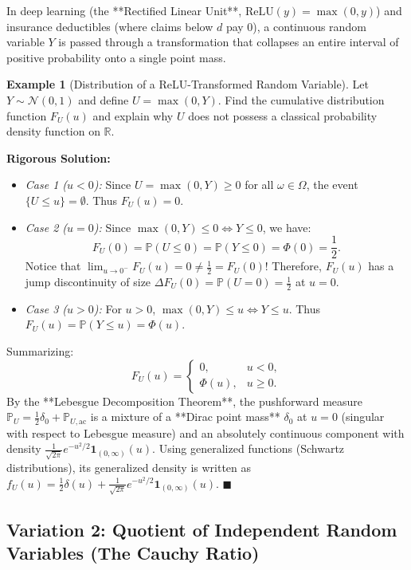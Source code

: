 \documentclass[11pt, letterpaper]{article}
\theoremstyle{definition}
\newtheorem{example}{Example}[section]
\theoremstyle{remark}
\newcommand{\R}{\mathbb{R}}
\newcommand{\Prob}{\mathbb{P}}
\begin{document}
In deep learning (the **Rectified Linear Unit**, $\text{ReLU}(y) = \max(0, y)$) and insurance deductibles (where claims below $d$ pay $0$), a continuous random variable $Y$ is passed through a transformation that collapses an entire interval of positive probability onto a single point mass.

\begin{example}[Distribution of a ReLU-Transformed Random Variable]
Let $Y \sim \mathcal{N}(0, 1)$ and define $U = \max(0, Y)$. Find the cumulative distribution function $F_U(u)$ and explain why $U$ does not possess a classical probability density function on $\R$.
\end{example}

\textbf{Rigorous Solution:}
\begin{itemize}
    \item \textit{Case 1 ($u < 0$):} Since $U = \max(0, Y) \ge 0$ for all $\omega \in \Omega$, the event $\{U \le u\} = \emptyset$. Thus $F_U(u) = 0$.
    \item \textit{Case 2 ($u = 0$):} Since $\max(0, Y) \le 0 \iff Y \le 0$, we have:
    \[
        F_U(0) = \Prob(U \le 0) = \Prob(Y \le 0) = \Phi(0) = \frac{1}{2}.
    \]
    Notice that $\lim_{u \to 0^-} F_U(u) = 0 \neq \frac{1}{2} = F_U(0)$! Therefore, $F_U(u)$ has a jump discontinuity of size $\Delta F_U(0) = \Prob(U = 0) = \frac{1}{2}$ at $u = 0$.
    \item \textit{Case 3 ($u > 0$):} For $u > 0$, $\max(0, Y) \le u \iff Y \le u$. Thus $F_U(u) = \Prob(Y \le u) = \Phi(u)$.
\end{itemize}
Summarizing:
\[
    F_U(u) = \begin{cases} 0, & u < 0, \\ \Phi(u), & u \ge 0. \end{cases}
\]
By the **Lebesgue Decomposition Theorem**, the pushforward measure $\Prob_U = \frac{1}{2}\delta_0 + \Prob_{U,\text{ac}}$ is a mixture of a **Dirac point mass** $\delta_0$ at $u = 0$ (singular with respect to Lebesgue measure) and an absolutely continuous component with density $\frac{1}{\sqrt{2\pi}}e^{-u^2/2}\mathbf{1}_{(0,\infty)}(u)$. Using generalized functions (Schwartz distributions), its generalized density is written as $f_U(u) = \frac{1}{2}\delta(u) + \frac{1}{\sqrt{2\pi}}e^{-u^2/2}\mathbf{1}_{(0,\infty)}(u)$. \hfill $\blacksquare$

\subsection{Variation 2: Quotient of Independent Random Variables (The Cauchy Ratio)}
\end{document}
